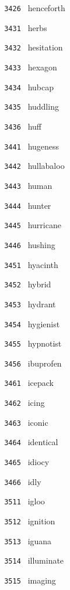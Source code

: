 \documentclass[11pt]{article}
\begin{document}
\begin{multicols}{6}
\noindent \texttt{ 3426 } henceforth  \par
\vspace{3mm}
\noindent \texttt{ 3431 } herbs  \par
\noindent \texttt{ 3432 } hesitation  \par
\noindent \texttt{ 3433 } hexagon  \par
\noindent \texttt{ 3434 } hubcap  \par
\noindent \texttt{ 3435 } huddling  \par
\noindent \texttt{ 3436 } huff  \par
\vspace{3mm}
\noindent \texttt{ 3441 } hugeness  \par
\noindent \texttt{ 3442 } hullabaloo  \par
\noindent \texttt{ 3443 } human  \par
\noindent \texttt{ 3444 } hunter  \par
\noindent \texttt{ 3445 } hurricane  \par
\noindent \texttt{ 3446 } hushing  \par
\vspace{3mm}
\noindent \texttt{ 3451 } hyacinth  \par
\noindent \texttt{ 3452 } hybrid  \par
\noindent \texttt{ 3453 } hydrant  \par
\noindent \texttt{ 3454 } hygienist  \par
\noindent \texttt{ 3455 } hypnotist  \par
\noindent \texttt{ 3456 } ibuprofen  \par
\vspace{3mm}
\noindent \texttt{ 3461 } icepack  \par
\noindent \texttt{ 3462 } icing  \par
\noindent \texttt{ 3463 } iconic  \par
\noindent \texttt{ 3464 } identical  \par
\noindent \texttt{ 3465 } idiocy  \par
\noindent \texttt{ 3466 } idly  \par
\noindent \texttt{ 3511 } igloo  \par
\noindent \texttt{ 3512 } ignition  \par
\noindent \texttt{ 3513 } iguana  \par
\noindent \texttt{ 3514 } illuminate  \par
\noindent \texttt{ 3515 } imaging  \par

\end{multicols}
\end{document}
